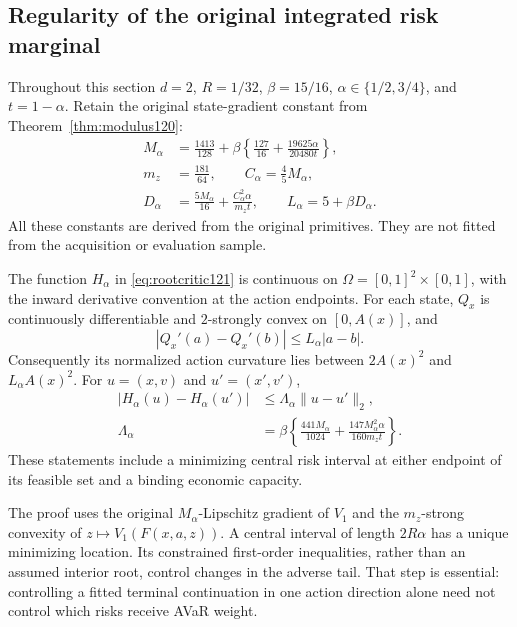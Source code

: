 \subsection{Regularity of the original integrated risk marginal}

Throughout this section \(d=2\), \(R=1/32\), \(\beta=15/16\),
\(\alpha\in\{1/2,3/4\}\), and \(t=1-\alpha\).  Retain the original
state-gradient constant from Theorem~\ref{thm:modulus120}:
\begin{align}
 M_\alpha&=\frac{1413}{128}
   +\beta\left\{\frac{127}{16}
               +\frac{19625\alpha}{20480t}\right\},\nonumber\\
 m_z&=\frac{181}{64},\qquad C_\alpha=\frac45M_\alpha,\nonumber\\
 D_\alpha&=\frac{5M_\alpha}{16}
                  +\frac{C_\alpha^2\alpha}{m_zt},\qquad
 L_\alpha=5+\beta D_\alpha.\label{eq:marginalconstants121}
\end{align}
All these constants are derived from the original primitives.
They are not fitted from the acquisition or evaluation sample.

\begin{theorem}
\label{thm:rootmarginal121}
The function \(H_\alpha\) in \eqref{eq:rootcritic121} is continuous on
\(\Omega=[0,1]^2\times[0,1]\), with the inward derivative convention at
the action endpoints.  For each state, \(Q_x\) is continuously
differentiable and \(2\)-strongly convex on \([0,A(x)]\), and
\[
 |Q_x'(a)-Q_x'(b)|\leq L_\alpha|a-b|.
\]
Consequently its normalized action curvature lies between
\(2A(x)^2\) and \(L_\alpha A(x)^2\).
For \(u=(x,v)\) and \(u'=(x',v')\),
\begin{align}
 |H_\alpha(u)-H_\alpha(u')|
 &\leq \Lambda_\alpha\|u-u'\|_2,\label{eq:rootmarginalmodulus121}\\
 \Lambda_\alpha
 &=\beta\left\{\frac{441M_\alpha}{1024}
       +\frac{147M_\alpha^2\alpha}{160m_zt}\right\}.\nonumber
\end{align}
These statements include a minimizing central risk interval at either
endpoint of its feasible set and a binding economic capacity.
\end{theorem}

The proof uses the original \(M_\alpha\)-Lipschitz gradient of \(V_1\)
and the \(m_z\)-strong convexity of
\(z\mapsto V_1(F(x,a,z))\).  A central interval of length \(2R\alpha\)
has a unique minimizing location.  Its constrained first-order
inequalities, rather than an assumed interior root, control changes
in the adverse tail.  That step is essential: controlling a fitted
terminal continuation in one action direction alone need not control
which risks receive AVaR weight.

